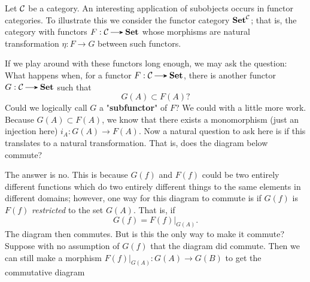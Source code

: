 \begin{example}\label{subfunctor_example}
    Let $\mathcal{C}$ be a category. An interesting application of subobjects occurs in functor categories. To illustrate this 
    we consider the functor category $\textbf{Set}^{\mathcal{C}}$; that is, the category with functors 
    $F: \cc \to \textbf{Set}$ whose morphisms are natural transformation $\eta: F \to G$ between 
    such functors. 
    
    If we play around with these functors long enough, we may ask the question:
    What happens when, for a functor $F: \cc \to \textbf{Set}$, there is another 
    functor $G: \cc \to \textbf{Set}$ such that 
    \[
        G(A) \subset F(A)?
    \]
    Could we logically call $G$ a "\textbf{subfunctor}" of $F$? We could with a little more work. 
    Because $G(A) \subset F(A)$,  we know that there exists a monomorphism (just an injection here)
    $i_A: G(A) \to F(A)$. Now a natural question to ask here is if this translates to a
    natural transformation. That is, does the diagram below commute?
    \begin{center}
        \hspace{1cm}
    \end{center} 
    The answer is no. This is because $G(f)$ and $F(f)$ could be two entirely different functions which do 
    two entirely different things to the same elements in different domains; however, 
    one way for this diagram to commute is if $G(f)$ is $F(f)$ \emph{restricted} to 
    the set $G(A)$. That is, if 
    \[
        G(f) = F(f)\big|_{G(A)}.
    \]
    The diagram then commutes. But is this the only way to make it commute? Suppose with no assumption of $G(f)$
    that the diagram did commute. Then we can still make a morphism $F(f)\big|_{G(A)}: G(A) \to G(B)$ to 
    get the commutative diagram 

\end{example}
